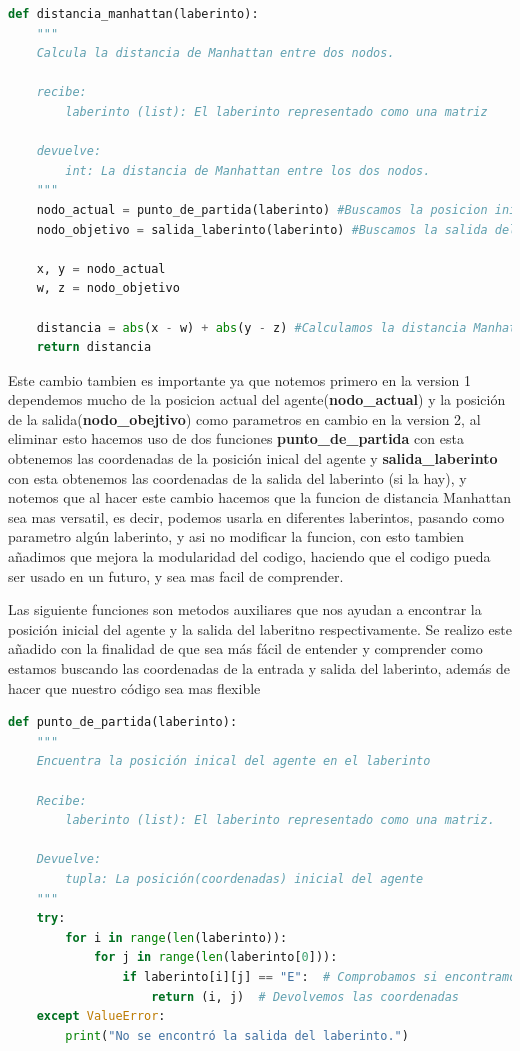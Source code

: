 \begin{lstlisting}[language=Python, caption=Version 2: distancia_manhattan]
    def distancia_manhattan(laberinto):
    """
    Calcula la distancia de Manhattan entre dos nodos.

    recibe:
        laberinto (list): El laberinto representado como una matriz

    devuelve:
        int: La distancia de Manhattan entre los dos nodos.
    """
    nodo_actual = punto_de_partida(laberinto) #Buscamos la posicion inicial del agente
    nodo_objetivo = salida_laberinto(laberinto) #Buscamos la salida del laberinto

    x, y = nodo_actual 
    w, z = nodo_objetivo
    
    distancia = abs(x - w) + abs(y - z) #Calculamos la distancia Manhattan dados dos puntos
    return distancia
\end{lstlisting}

Este cambio tambien es importante ya que notemos primero en la version 1 dependemos mucho de la posicion actual del agente(\textbf{nodo_actual}) y la posición de la salida(\textbf{nodo_obejtivo}) como parametros en cambio en la version 2, al eliminar esto hacemos uso de dos funciones \textbf{punto_de_partida} con esta obtenemos las coordenadas de la posición inical del agente y \textbf{salida_laberinto} con esta obtenemos las coordenadas de la salida del laberinto (si la hay), y notemos que al hacer este cambio hacemos que la funcion de distancia Manhattan sea mas versatil, es decir, podemos usarla en diferentes laberintos, pasando como parametro algún laberinto, y asi no modificar la funcion, con esto tambien añadimos que mejora la modularidad del codigo, haciendo que el codigo pueda ser usado en un futuro, y sea mas facil de comprender.

Las siguiente funciones son metodos auxiliares que nos ayudan a encontrar la posición inicial del agente y la salida del laberitno respectivamente.
Se realizo este añadido con la finalidad de que sea más fácil de entender y comprender como estamos buscando las coordenadas de la entrada y salida del laberinto, además de hacer que nuestro código sea mas flexible

\begin{lstlisting}[language=Python, caption=Función auxiliar: punto_de_partida]
    def punto_de_partida(laberinto):
    """
    Encuentra la posición inical del agente en el laberinto

    Recibe:
        laberinto (list): El laberinto representado como una matriz.

    Devuelve:
        tupla: La posición(coordenadas) inicial del agente
    """
    try:
        for i in range(len(laberinto)):
            for j in range(len(laberinto[0])):
                if laberinto[i][j] == "E":  # Comprobamos si encontramos la entrada
                    return (i, j)  # Devolvemos las coordenadas 
    except ValueError:
        print("No se encontró la salida del laberinto.")
\end{lstlisting}

